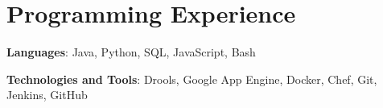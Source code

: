 \section{Programming Experience}
  \resumePositionListStart
    \item{
      \textbf{Languages}{: Java, Python, SQL, JavaScript, Bash}
    }\vspace{-8pt}
    \item{
      \textbf{Technologies and Tools}{: Drools, Google App Engine, Docker, Chef, Git, Jenkins, GitHub}
    }\vspace{-8pt}
  \resumePositionListEnd